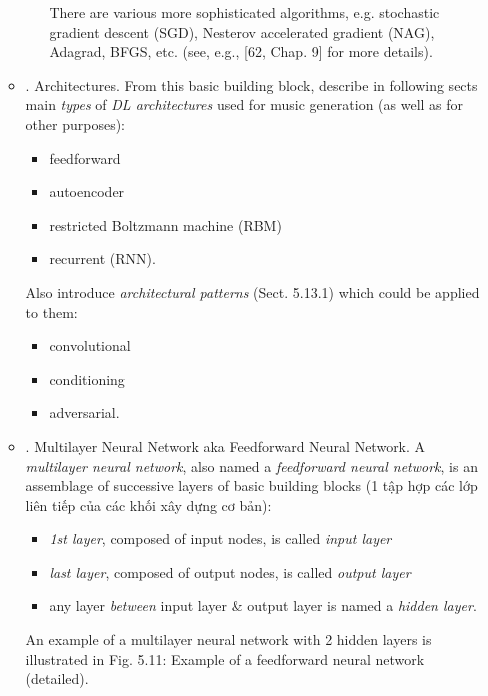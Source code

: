 \documentclass{article}
\begin{document}
\begin{itemize}
\begin{itemize}
\begin{itemize}
			There are various more sophisticated algorithms, e.g. stochastic gradient descent (SGD), Nesterov accelerated gradient (NAG), Adagrad, BFGS, etc. (see, e.g., [62, Chap. 9] for more details).			
		\end{itemize}
		\item {. Architectures.} From this basic building block, describe in following sects main {\it types} of {\it DL architectures} used for music generation (as well as for other purposes):
		\begin{itemize}
			\item feedforward
			\item autoencoder
			\item restricted Boltzmann machine (RBM)
			\item recurrent (RNN).
		\end{itemize}
		Also introduce {\it architectural patterns} (Sect. 5.13.1) which could be applied to them:
		\begin{itemize}
			\item convolutional
			\item conditioning
			\item adversarial.
		\end{itemize}
		\item {. Multilayer Neural Network aka Feedforward Neural Network.} A {\it multilayer neural network}, also named a {\it feedforward neural network}, is an assemblage of successive layers of basic building blocks (1 tập hợp các lớp liên tiếp của các khối xây dựng cơ bản):
		\begin{itemize}
			\item {\it1st layer}, composed of input nodes, is called {\it input layer}
			\item {\it last layer}, composed of output nodes, is called {\it output layer}
			\item any layer {\it between} input layer \& output layer is named a {\it hidden layer}.
		\end{itemize}
		An example of a multilayer neural network with 2 hidden layers is illustrated in {\sf Fig. 5.11: Example of a feedforward neural network (detailed).}
		

\end{itemize}
\end{itemize}
\end{document}
